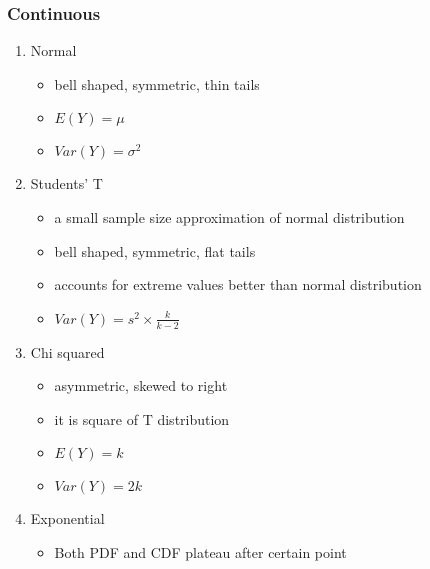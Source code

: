 \documentclass[tiles]{cornellnotes}
\begin{document}
\begin{cuenotes}
{                        \subsubsection*{Continuous}
                        \begin{enumerate}
                                \item Normal
                                \begin{itemize}
                                        \item bell shaped, symmetric, thin tails
                                        \item $E(Y) = \mu$
                                        \item $Var(Y) = \sigma^2$
                                \end{itemize}
                                \item Students' T
                                \begin{itemize}
                                        \item a small sample size approximation of normal distribution
                                        \item bell shaped, symmetric, flat tails
                                        \item accounts for extreme values better than normal distribution
                                        \item $Var(Y) = s^2 \times \frac{k}{k-2}$
                                \end{itemize}
                                \item Chi squared
                                \begin{itemize}
                                        \item asymmetric, skewed to right
                                        \item it is square of T distribution
                                        \item $E(Y) = k$
                                        \item $Var(Y) = 2k$
                                \end{itemize}
                                \item Exponential
                                \begin{itemize}
                                        \item Both PDF and CDF plateau after certain point

\end{itemize}
\end{enumerate}}
\end{cuenotes}
\end{document}

